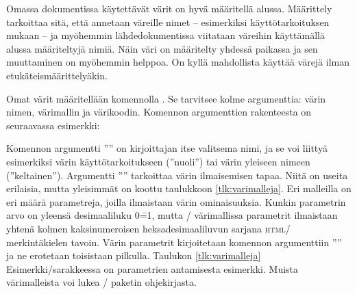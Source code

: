 Omassa dokumentissa käytettävät värit on hyvä määritellä alussa.
Määrittely tarkoittaa sitä, että annetaan väreille nimet -- esimerkiksi
käyttötarkoituksen mukaan -- ja myöhemmin lähdedokumentissa viitataan
väreihin käyttämällä alussa määriteltyjä nimiä. Näin väri on määritelty
yhdessä paikassa ja sen muuttaminen on myöhemmin helppoa. On kyllä
mahdollista käyttää värejä ilman etukäteismäärittelyäkin.


Omat värit määritellään komennolla . Se tarvitsee
kolme argumenttia: värin nimen, värimallin ja värikoodin. Komennon
argumenttien rakenteesta on seuraavassa esimerkki:

\begin{koodilohkosis}
\end{koodilohkosis}

Komennon argumentti '''' on kirjoittajan itse valitsema
nimi, ja se voi liittyä esimerkiksi värin käyttötarkoitukseen
(''nuoli'') tai värin yleiseen nimeen (''keltainen''). Argumentti
'''' tarkoittaa värin ilmaisemisen tapaa. Niitä on
useita erilaisia, mutta yleisimmät on koottu taulukkoon
\ref{tlk:varimalleja}. Eri malleilla on eri määrä parametreja, joilla
ilmaistaan värin ominaisuuksia. Kunkin parametrin arvo on yleensä
desimaaliluku 0\==1, mutta \-/ värimallissa parametrit
ilmaistaan yhtenä kolmen kaksinumeroisen heksadesimaaliluvun sarjana
\textsc{html}\-/ merkintäkielen tavoin. Värin parametrit kirjoitetaan
komennon argumenttiin '''' ja ne erotetaan
toisistaan pilkulla. Taulukon \ref{tlk:varimalleja}
Esimerkki\-/sarakkeessa on parametrien antamisesta esimerkki. Muista
värimalleista voi lukea \-/ paketin ohjekirjasta.

